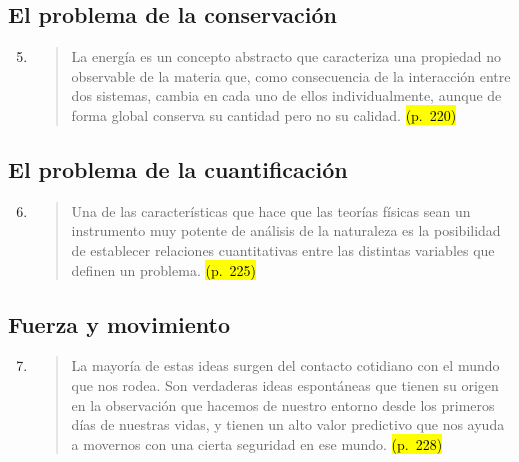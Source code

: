 \documentclass{article}
\begin{document}
\subsection*{El problema de la conservación}

\begin{enumerate}
  \setcounter{enumi}{4}
  \item
  \begin{quote}
  La energía es un concepto abstracto que caracteriza una propiedad no observable de la materia que, como consecuencia de la interacción entre dos sistemas, cambia en cada uno de ellos individualmente, aunque de forma global conserva su cantidad pero no su calidad. \hl{(p.~220)}
  \end{quote}
\end{enumerate}

\subsection*{El problema de la cuantificación}

\begin{enumerate}
  \setcounter{enumi}{5}
  \item
  \begin{quote}
  Una de las características que hace que las teorías físicas sean un instrumento muy potente de análisis de la naturaleza es la posibilidad de establecer relaciones cuantitativas entre las distintas variables que definen un problema. \hl{(p.~225)}
  \end{quote}
\end{enumerate}

\subsection*{Fuerza y movimiento}

\begin{enumerate}
  \setcounter{enumi}{6}
  \item
  \begin{quote}
  La mayoría de estas ideas surgen del contacto cotidiano con el mundo que nos rodea. Son verdaderas ideas espontáneas que tienen su origen en la observación que hacemos de nuestro entorno desde los primeros días de nuestras vidas, y tienen un alto valor predictivo que nos ayuda a movernos con una cierta seguridad en ese mundo. \hl{(p.~228)}
  \end{quote}
\end{enumerate}
\end{document}
